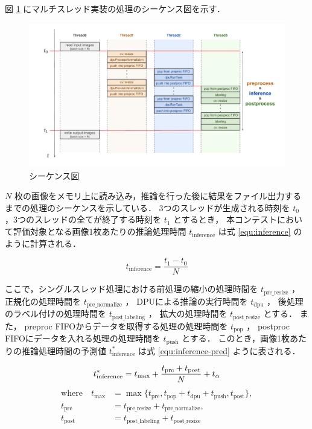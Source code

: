図 \ref{fig:sequence} にマルチスレッド実装の処理のシーケンス図を示す．

\begin{figure}[h]
  \begin{center}
    \includegraphics[width=\linewidth]{figures/sw_opt_sequence.pdf}
    \caption{シーケンス図}
    \label{fig:sequence}
  \end{center}
\end{figure}

$N$ 枚の画像をメモリ上に読み込み，推論を行った後に結果をファイル出力するまでの処理のシーケンスを示している．
3つのスレッドが生成される時刻を $t_0$ ，3つのスレッドの全てが終了する時刻を $t_1$ とするとき，
本コンテストにおいて評価対象となる画像1枚あたりの推論処理時間 $t_{\mathrm{inference}}$ は式 \ref{equ:inference} のように計算される．

\begin{equation}
  \label{equ:inference}
  t_{\mathrm{inference}} = \frac{t_1 - t_0}{N}
\end{equation}

ここで，シングルスレッド処理における前処理の縮小の処理時間を $t_{\mathrm{pre\_resize}}$ ，
正規化の処理時間を $t_{\mathrm{pre\_normalize}}$ ，
DPUによる推論の実行時間を $t_{\mathrm{dpu}}$ ，
後処理のラベル付けの処理時間を $t_{\mathrm{post\_labeling}}$ ，
拡大の処理時間を $t_{\mathrm{post\_resize}}$ とする．
また，
preproc FIFOからデータを取得する処理の処理時間を $t_{\mathrm{pop}}$ ，
postproc FIFOにデータを入れる処理の処理時間を $t_{\mathrm{push}}$ とする．
このとき，画像1枚あたりの推論処理時間の予測値 $t_{\mathrm{inference}}^*$ は式 \ref{equ:inference-pred} ように表される．

\begin{equation}
  \label{equ:inference-pred}
    t_{\mathrm{inference}}^* = t_{\mathrm{max}} + \frac{t_{\mathrm{pre}} + t_{\mathrm{post}}}{N} + t_\alpha \\
\end{equation}
\begin{equation*}
    \begin{split}
      \text{where} \quad t_{\mathrm{max}} &= \max \{t_{\mathrm{pre}}, t_{\mathrm{pop}} + t_{\mathrm{dpu}} + t_{\mathrm{push}}, t_{\mathrm{post}}\}, \\
      t_{\mathrm{pre}} &= t_{\mathrm{pre\_resize}} + t_{\mathrm{pre\_normalize}}, \\
      t_{\mathrm{post}} &= t_{\mathrm{post\_labeling}} + t_{\mathrm{post\_resize}}
    \end{split}
\end{equation*}

